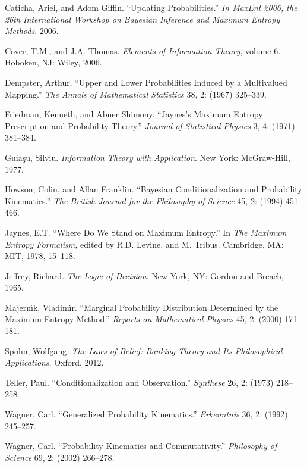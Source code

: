Caticha, Ariel, and Adom Giffin. ``Updating Probabilities.'' \emph{In MaxEnt 2006, the 26th International Workshop on Bayesian Inference and Maximum Entropy Methods}. 2006.

Cover, T.M., and J.A. Thomas. \emph{Elements of Information Theory}, volume 6. Hoboken, NJ: Wiley, 2006.

Dempster, Arthur. ``Upper and Lower Probabilities Induced by a Multivalued Mapping.'' \emph{The Annals of Mathematical Statistics} 38, 2: (1967) 325--339.

Friedman, Kenneth, and Abner Shimony. ``Jaynes's Maximum Entropy Prescription and Probability Theory.'' \emph{Journal of Statistical Physics} 3, 4: (1971) 381--384.

Guia{\c{s}}u, Silviu. \emph{Information Theory with Application}. New York: McGraw-Hill, 1977.

Howson, Colin, and Allan Franklin. ``Bayesian Conditionalization and Probability Kinematics.'' \emph{The British Journal for the Philosophy of Science} 45, 2: (1994) 451--466.

Jaynes, E.T. ``Where Do We Stand on Maximum Entropy.'' In \emph{The Maximum Entropy Formalism,} edited by R.D. Levine, and M. Tribus. Cambridge, MA: MIT, 1978, 15--118.

Jeffrey, Richard. \emph{The Logic of Decision}. New York, NY: Gordon and Breach, 1965.

Majern{\'\i}k, Vladim{\'\i}r. ``Marginal Probability Distribution Determined by the Maximum Entropy Method.'' \emph{Reports on Mathematical Physics} 45, 2: (2000) 171--181.

Spohn, Wolfgang. \emph{The Laws of Belief: Ranking Theory and Its Philosophical Applications}. Oxford, 2012.

Teller, Paul. ``Conditionalization and Observation.'' \emph{Synthese} 26, 2: (1973) 218--258.

Wagner, Carl. ``Generalized Probability Kinematics.'' \emph{Erkenntnis} 36, 2: (1992) 245--257.

Wagner, Carl. ``Probability Kinematics and Commutativity.'' \emph{Philosophy of Science} 69, 2: (2002) 266--278.
